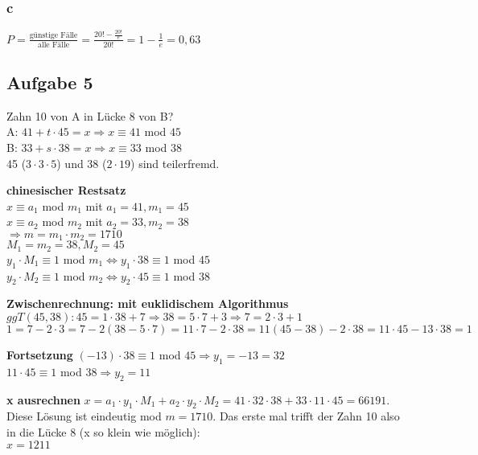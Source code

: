 \subsubsection{c}$P=\frac{\textrm{günstige Fälle}}{\textrm{alle Fälle}}=\frac{20!-\frac{20!}{e}}{20!} = 1-\frac{1}{e}=0,63$

\subsection{Aufgabe 5}
Zahn 10 von A in Lücke 8 von B?\\
A: $41+t\cdot 45=x \Rightarrow x\equiv 41$ mod $45$ \\
B: $33+s\cdot 38=x \Rightarrow x\equiv 33$ mod $38$\\
45 ($3\cdot 3\cdot 5$) und 38 ($2\cdot 19$) sind teilerfremd.

\textbf{chinesischer Restsatz}\\
$x\equiv a_1$ mod $m_1$ mit $a_1=41,m_1=45$\\
$x\equiv a_2$ mod $m_2$ mit $a_2=33, m_2=38$\\
$\Rightarrow m=m_1\cdot m_2=1710$\\
$M_1=m_2=38, M_2=45$\\
$y_1\cdot M_1\equiv 1$ mod $m_1 \Leftrightarrow y_1\cdot 38\equiv 1$ mod $45$\\
$y_2\cdot M_2\equiv 1$ mod $m_2 \Leftrightarrow y_2\cdot 45\equiv 1$ mod $38$

\textbf{Zwischenrechnung: mit euklidischem Algorithmus} 
$ggT(45,38): 45=1\cdot 38+7 \Rightarrow 38=5\cdot 7+3 \Rightarrow 7=2\cdot 3+1$\\
$1=7-2\cdot 3=7-2(38-5\cdot 7)=11\cdot 7-2\cdot 38=11(45-38)-2\cdot 38=11\cdot 45-13\cdot 38=1$

\textbf{Fortsetzung}
$(-13)\cdot 38\equiv1$ mod $45 \Rightarrow y_1=-13=32$\\
$11\cdot 45\equiv 1$ mod $38 \Rightarrow y_2=11$

\textbf{x ausrechnen} $x=a_1\cdot y_1\cdot M_1 + a_2\cdot y_2\cdot M_2=41\cdot 32\cdot 38+33\cdot 11\cdot 45=66191$. Diese Lösung ist eindeutig mod $m=1710$. Das erste mal trifft der Zahn 10 also in die Lücke 8 (x so klein wie möglich):\\
$x=1211$
